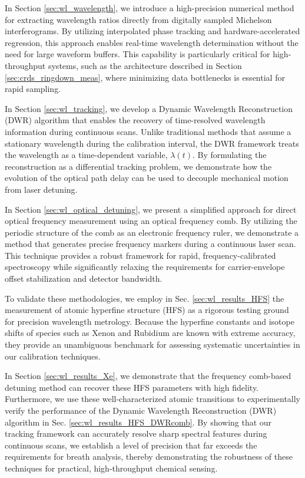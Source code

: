 \documentclass[8pt,a4paper]{report}
\begin{document}
	In Section \ref{sec:wl_wavelength}, we introduce a high-precision numerical method for extracting wavelength ratios directly from digitally sampled Michelson interferograms. By utilizing interpolated phase tracking and hardware-accelerated regression, this approach enables real-time wavelength determination without the need for large waveform buffers. This capability is particularly critical for high-throughput systems, such as the architecture described in Section \ref{sec:crds_ringdown_meas}, where minimizing data bottlenecks is essential for rapid sampling.
	
	In Section \ref{sec:wl_tracking}, we develop a Dynamic Wavelength Reconstruction (DWR) algorithm that enables the recovery of time-resolved wavelength information during continuous scans. Unlike traditional methods that assume a stationary wavelength during the calibration interval, the DWR framework treats the wavelength as a time-dependent variable, $\lambda(t)$. By formulating the reconstruction as a differential tracking problem, we demonstrate how the evolution of the optical path delay can be used to decouple mechanical motion from laser detuning.
	
	In Section \ref{sec:wl_optical_detuning}, we present a simplified approach for direct optical frequency measurement using an optical frequency comb. By utilizing the periodic structure of the comb as an electronic frequency ruler, we demonstrate a method that generates precise frequency markers during a continuous laser scan. This technique provides a robust framework for rapid, frequency-calibrated spectroscopy while significantly relaxing the requirements for carrier-envelope offset stabilization and detector bandwidth.
	
	To validate these methodologies, we employ in Sec. \ref{sec:wl_results_HFS} the measurement of atomic hyperfine structure (HFS) as a rigorous testing ground for precision wavelength metrology. Because the hyperfine constants and isotope shifts of species such as Xenon and Rubidium are known with extreme accuracy, they provide an unambiguous benchmark for assessing systematic uncertainties in our calibration techniques. 
	
	In Section \ref{sec:wl_results_Xe}, we demonstrate that the frequency comb-based detuning method can recover these HFS parameters with high fidelity. Furthermore, we use these well-characterized atomic transitions to experimentally verify the performance of the Dynamic Wavelength Reconstruction (DWR) algorithm in Sec. \ref{sec:wl_results_HFS_DWRcomb}. By showing that our tracking framework can accurately resolve sharp spectral features during continuous scans, we establish a level of precision that far exceeds the requirements for breath analysis, thereby demonstrating the robustness of these techniques for practical, high-throughput chemical sensing.
	
\end{document}
